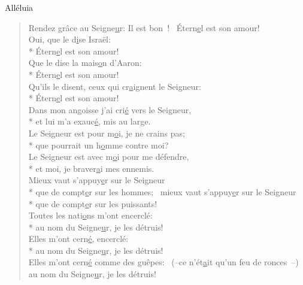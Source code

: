 Alléluia

\begin{verse}
Rendez grâce au Seigne\underline{u}r: Il est bon !~\psalmstar
Étern\underline{e}l est son amour! \\

Oui, que le d\underline{i}se Israël: \\*
Étern\underline{e}l est son amour! \\
Que le dise la mais\underline{o}n d’Aaron: \\*
Étern\underline{e}l est son amour! \\
Qu’ils le disent, ceux qui cr\underline{a}ignent le Seigneur: \\*
Étern\underline{e}l est son amour! \\

Dans mon angoisse j’ai cri\underline{é} vers le Seigneur, \\*
et lui m’a exauc\underline{é}, mis au large. \\
Le Seigneur est pour m\underline{o}i, je ne crains pas; \\*
que pourrait un h\underline{o}mme contre moi? \\
Le Seigneur est avec m\underline{o}i pour me défendre, \\*
et moi, je braver\underline{a}i mes ennemis. \\

Mieux vaut s’appuy\underline{e}r sur le Seigneur \\*
que de compt\underline{e}r sur les hommes;~\psalmstar
{}mieux vaut s’appuy\underline{e}r sur le Seigneur \\*
que de compt\underline{e}r sur les puissants! \\

Toutes les nati\underline{o}ns m’ont encerclé: \\*
au nom du Seigne\underline{u}r, je les détruis! \\
Elles m’ont cern\underline{é}, encerclé: \\*
au nom du Seigne\underline{u}r, je les détruis! \\
Elles m’ont cern\underline{é} comme des guêpes:~\psalmdagger
(–ce n’ét\underline{a}it qu’un feu de ronces –)~\psalmstar
au nom du Seigne\underline{u}r, je les détruis! \\


\end{verse}
